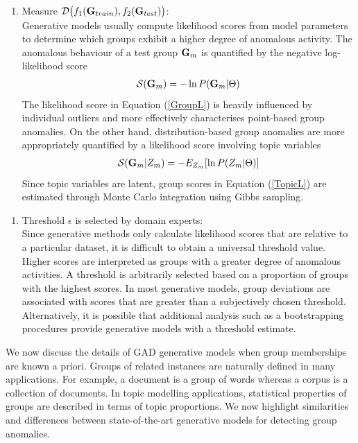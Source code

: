 \begin{enumerate}[3.] 
\item Measure $ \mathcal{D}\big(f_1({\bf G}_{train}), f_2({\bf G}_{test})\big )$: \\
Generative models usually compute likelihood scores  from model parameters to determine which groups exhibit a higher degree of anomalous activity.  
 The anomalous behaviour of a test group ${\bf G}_{m}$ is  quantified by the negative log-likelihood score
 \begin{align}
 \mathcal{S} ({\bf G}_{m}) = - \ln P({\bf G}_{m} | \Theta) \label{GroupL}
 \end{align}
 The likelihood score in Equation (\ref{GroupL}) is heavily influenced by individual outliers and more effectively characterises point-based group anomalies. On the other hand, distribution-based group anomalies are more appropriately quantified by a likelihood score involving topic variables  
\begin{align}
 \mathcal{S} ({\bf G}_{m}|Z_{m}) = - E_{Z_{m}} [\ln P({Z}_{m} | \Theta) ] 
  \label{TopicL}
\end{align}
Since topic variables are latent,  group scores in Equation  (\ref{TopicL}) are estimated through Monte Carlo integration using Gibbs sampling.  
\end{enumerate}

 

\begin{enumerate}[4.]
\item Threshold $\epsilon $ is  selected by domain experts: \\  
Since generative methods only calculate likelihood scores that are relative to a particular dataset, it is difficult to obtain a universal threshold value.  Higher  scores are interpreted as groups with a greater degree of anomalous activities. A threshold is arbitrarily selected based on a proportion of  groups with the highest scores.  In most  generative models, group deviations are associated with  scores that are greater than a subjectively chosen  threshold. Alternatively, it is possible that additional analysis such as a  bootstrapping procedures  provide generative models with a  threshold estimate.  
\end{enumerate} 
 
We now discuss the details of GAD generative models when group memberships are known a priori. Groups of related instances are naturally defined in many applications. For example,  a document is a group of words whereas a corpus is a collection of documents.    
 In topic modelling applications, statistical properties of groups are described in terms of topic proportions. We now highlight similarities and differences between state-of-the-art generative models for detecting group anomalies.  

